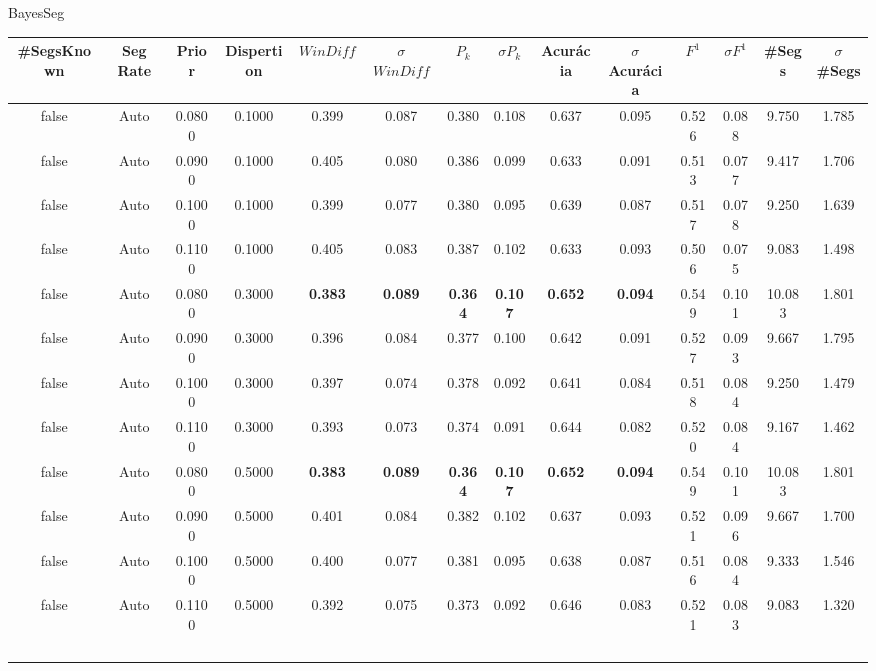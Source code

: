  \newpage
 \center BayesSeg
\begin{longtable}[c]{|c|c|c|c|c|c|c|c|c|c|c|c|c|c|} 
\hline 
 \#SegsKnown & Seg Rate & Prior & Dispertion & $WinDiff$ & $\sigma$$WinDiff$ & $P_k$ & $\sigma$$P_k$ & Acurácia & $\sigma$Acurácia & $F^1$ & $\sigma$$F^1$ & \#Segs & $\sigma$\#Segs\\ \hline 
 false & Auto & 0.0800 & 0.1000 & 0.399 & 0.087 & 0.380 & 0.108 & 0.637 & 0.095 & 0.526 & 0.088 & 9.750 & 1.785  \\ \hline 
  false & Auto & 0.0900 & 0.1000 & 0.405 & 0.080 & 0.386 & 0.099 & 0.633 & 0.091 & 0.513 & 0.077 & 9.417 & 1.706  \\ \hline 
  false & Auto & 0.1000 & 0.1000 & 0.399 & 0.077 & 0.380 & 0.095 & 0.639 & 0.087 & 0.517 & 0.078 & 9.250 & 1.639  \\ \hline 
  false & Auto & 0.1100 & 0.1000 & 0.405 & 0.083 & 0.387 & 0.102 & 0.633 & 0.093 & 0.506 & 0.075 & 9.083 & 1.498  \\ \hline 
  false & Auto & 0.0800 & 0.3000 & \cellcolor{gray!20} \textbf{0.383} & \cellcolor{gray!20} \textbf{0.089} & \cellcolor{gray!20} \textbf{0.364} & \cellcolor{gray!20} \textbf{0.107} & \cellcolor{gray!20} \textbf{0.652} & \cellcolor{gray!20} \textbf{0.094} & 0.549 & 0.101 & 10.083 & 1.801  \\ \hline 
  false & Auto & 0.0900 & 0.3000 & 0.396 & 0.084 & 0.377 & 0.100 & 0.642 & 0.091 & 0.527 & 0.093 & 9.667 & 1.795  \\ \hline 
  false & Auto & 0.1000 & 0.3000 & 0.397 & 0.074 & 0.378 & 0.092 & 0.641 & 0.084 & 0.518 & 0.084 & 9.250 & 1.479  \\ \hline 
  false & Auto & 0.1100 & 0.3000 & 0.393 & 0.073 & 0.374 & 0.091 & 0.644 & 0.082 & 0.520 & 0.084 & 9.167 & 1.462  \\ \hline 
  false & Auto & 0.0800 & 0.5000 & \cellcolor{gray!20} \textbf{0.383} & \cellcolor{gray!20} \textbf{0.089} & \cellcolor{gray!20} \textbf{0.364} & \cellcolor{gray!20} \textbf{0.107} & \cellcolor{gray!20} \textbf{0.652} & \cellcolor{gray!20} \textbf{0.094} & 0.549 & 0.101 & 10.083 & 1.801  \\ \hline 
  false & Auto & 0.0900 & 0.5000 & 0.401 & 0.084 & 0.382 & 0.102 & 0.637 & 0.093 & 0.521 & 0.096 & 9.667 & 1.700  \\ \hline 
  false & Auto & 0.1000 & 0.5000 & 0.400 & 0.077 & 0.381 & 0.095 & 0.638 & 0.087 & 0.516 & 0.084 & 9.333 & 1.546  \\ \hline 
  false & Auto & 0.1100 & 0.5000 & 0.392 & 0.075 & 0.373 & 0.092 & 0.646 & 0.083 & 0.521 & 0.083 & 9.083 & 1.320  \\ \hline 
$$
\end{longtable}
